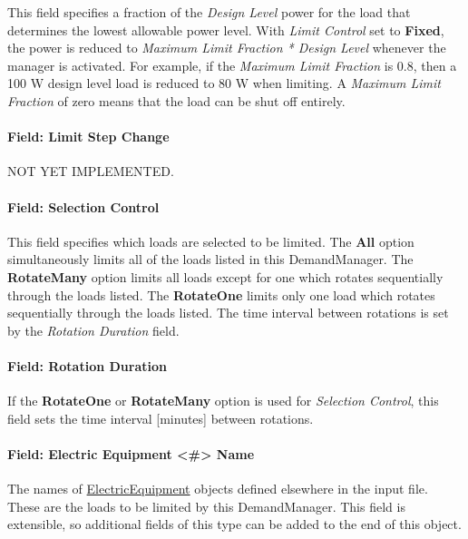 This field specifies a fraction of the \emph{Design Level} power for the load that determines the lowest allowable power level. With \emph{Limit Control} set to \textbf{Fixed}, the power is reduced to \emph{Maximum Limit Fraction * Design Level} whenever the manager is activated. For example, if the \emph{Maximum Limit Fraction} is 0.8, then a 100 W design level load is reduced to 80 W when limiting. A \emph{Maximum Limit Fraction} of zero means that the load can be shut off entirely.

\paragraph{Field: Limit Step Change}\label{field-limit-step-change-2}

NOT YET IMPLEMENTED.

\paragraph{Field: Selection Control}\label{field-selection-control-2}

This field specifies which loads are selected to be limited. The \textbf{All} option simultaneously limits all of the loads listed in this DemandManager. The \textbf{RotateMany} option limits all loads except for one which rotates sequentially through the loads listed. The \textbf{RotateOne} limits only one load which rotates sequentially through the loads listed. The time interval between rotations is set by the \emph{Rotation Duration} field.

\paragraph{Field: Rotation Duration}\label{field-rotation-duration-2}

If the \textbf{RotateOne} or \textbf{RotateMany} option is used for \emph{Selection Control}, this field sets the time interval {[}minutes{]} between rotations.

\paragraph{Field: Electric Equipment \textless{}\#\textgreater{} Name}\label{field-electric-equipment-1-10-name}

The names of \hyperref[electricequipment]{ElectricEquipment} objects defined elsewhere in the input file. These are the loads to be limited by this DemandManager.  This field is extensible, so additional fields of this type can be added to the end of this object.

